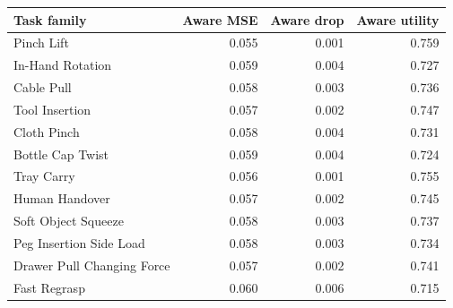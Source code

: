 \begin{tabular}{lrrr}
\toprule
Task family & Aware MSE & Aware drop & Aware utility \\
\midrule
Pinch Lift & 0.055 & 0.001 & 0.759 \\
In-Hand Rotation & 0.059 & 0.004 & 0.727 \\
Cable Pull & 0.058 & 0.003 & 0.736 \\
Tool Insertion & 0.057 & 0.002 & 0.747 \\
Cloth Pinch & 0.058 & 0.004 & 0.731 \\
Bottle Cap Twist & 0.059 & 0.004 & 0.724 \\
Tray Carry & 0.056 & 0.001 & 0.755 \\
Human Handover & 0.057 & 0.002 & 0.745 \\
Soft Object Squeeze & 0.058 & 0.003 & 0.737 \\
Peg Insertion Side Load & 0.058 & 0.003 & 0.734 \\
Drawer Pull Changing Force & 0.057 & 0.002 & 0.741 \\
Fast Regrasp & 0.060 & 0.006 & 0.715 \\
\bottomrule
\end{tabular}
